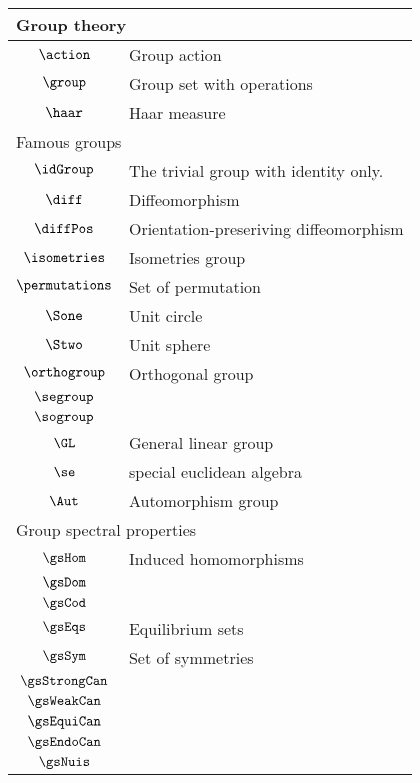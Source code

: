 \begin{longtable}{cl}
\multicolumn{2}{l}{Group theory}\\ 
 \hline
\hline
$\action$ &  Group action\\ 
 $\group$ &  Group set with operations\\ 
 $\haar$ &  Haar measure\\ 
 \multicolumn{2}{l}{Famous groups}\\ 
 \hline
$\idGroup$ &  The trivial group with identity only.\\ 
 $\diff$ &  Diffeomorphism\\ 
 $\diffPos$ &  Orientation-preseriving diffeomorphism\\ 
 $\isometries$ &  Isometries group\\ 
 $\permutations$ &  Set of permutation\\ 
 $\Sone$ &  Unit circle\\ 
 $\Stwo$ &  Unit sphere\\ 
 $\orthogroup$ &  Orthogonal group\\ 
 $\segroup$ & \\ 
 $\sogroup$ & \\ 
 $\GL$ &  General linear group\\ 
 $\se$ &  special euclidean algebra\\ 
 $\Aut$ &  Automorphism group\\ 
 \multicolumn{2}{l}{Group spectral properties}\\ 
 \hline
\hline
$\gsHom$ &  Induced homomorphisms\\ 
 $\gsDom$ &  \\ 
 $\gsCod$ &  \\ 
 $\gsEqs$ &  Equilibrium sets\\ 
 $\gsSym$ &  Set of symmetries\\ 
 $\gsStrongCan$ &  \\ 
 $\gsWeakCan$ &  \\ 
 $\gsEquiCan$ &  \\ 
 $\gsEndoCan$ &  \\ 
 $\gsNuis$ &  \\ 
 \end{longtable}
